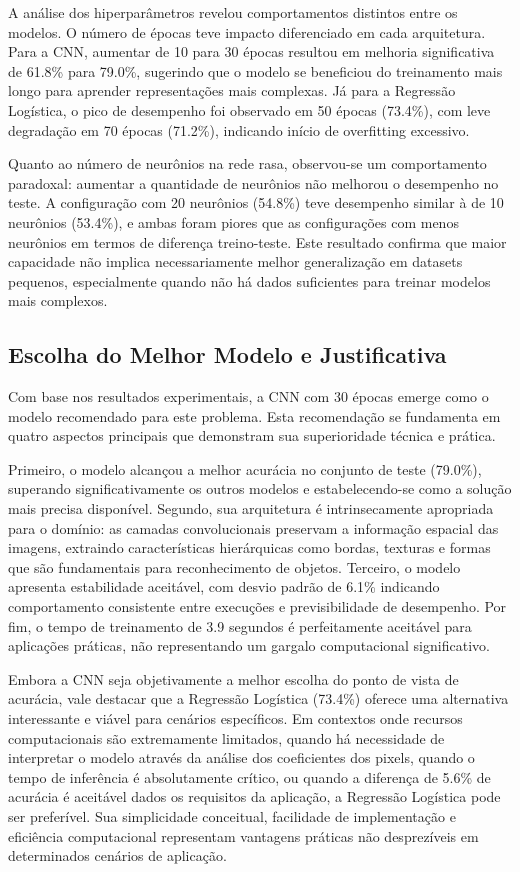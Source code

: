 \documentclass[a4paper,12pt]{article}
\begin{document}
A análise dos hiperparâmetros revelou comportamentos distintos entre os modelos. O número de épocas teve impacto diferenciado em cada arquitetura. Para a CNN, aumentar de 10 para 30 épocas resultou em melhoria significativa de 61.8\% para 79.0\%, sugerindo que o modelo se beneficiou do treinamento mais longo para aprender representações mais complexas. Já para a Regressão Logística, o pico de desempenho foi observado em 50 épocas (73.4\%), com leve degradação em 70 épocas (71.2\%), indicando início de overfitting excessivo.

Quanto ao número de neurônios na rede rasa, observou-se um comportamento paradoxal: aumentar a quantidade de neurônios não melhorou o desempenho no teste. A configuração com 20 neurônios (54.8\%) teve desempenho similar à de 10 neurônios (53.4\%), e ambas foram piores que as configurações com menos neurônios em termos de diferença treino-teste. Este resultado confirma que maior capacidade não implica necessariamente melhor generalização em datasets pequenos, especialmente quando não há dados suficientes para treinar modelos mais complexos.

\subsection{Escolha do Melhor Modelo e Justificativa}

Com base nos resultados experimentais, a CNN com 30 épocas emerge como o modelo recomendado para este problema. Esta recomendação se fundamenta em quatro aspectos principais que demonstram sua superioridade técnica e prática.

Primeiro, o modelo alcançou a melhor acurácia no conjunto de teste (79.0\%), superando significativamente os outros modelos e estabelecendo-se como a solução mais precisa disponível. Segundo, sua arquitetura é intrinsecamente apropriada para o domínio: as camadas convolucionais preservam a informação espacial das imagens, extraindo características hierárquicas como bordas, texturas e formas que são fundamentais para reconhecimento de objetos. Terceiro, o modelo apresenta estabilidade aceitável, com desvio padrão de 6.1\% indicando comportamento consistente entre execuções e previsibilidade de desempenho. Por fim, o tempo de treinamento de 3.9 segundos é perfeitamente aceitável para aplicações práticas, não representando um gargalo computacional significativo.

Embora a CNN seja objetivamente a melhor escolha do ponto de vista de acurácia, vale destacar que a Regressão Logística (73.4\%) oferece uma alternativa interessante e viável para cenários específicos. Em contextos onde recursos computacionais são extremamente limitados, quando há necessidade de interpretar o modelo através da análise dos coeficientes dos pixels, quando o tempo de inferência é absolutamente crítico, ou quando a diferença de 5.6\% de acurácia é aceitável dados os requisitos da aplicação, a Regressão Logística pode ser preferível. Sua simplicidade conceitual, facilidade de implementação e eficiência computacional representam vantagens práticas não desprezíveis em determinados cenários de aplicação.
\end{document}
